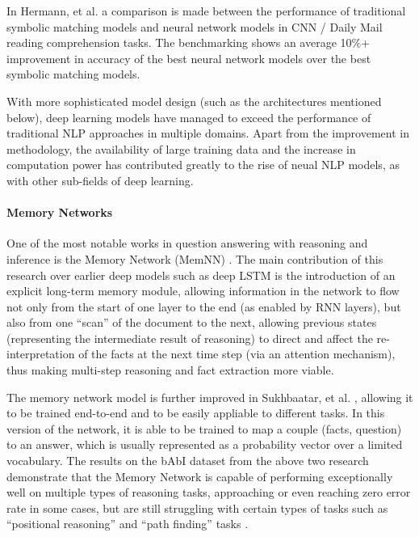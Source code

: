 \documentclass[]{article}
\begin{document}
In Hermann, et al. \cite{hermann2015teaching} a comparison is made between the performance of traditional symbolic matching models and neural network models in CNN / Daily Mail reading comprehension tasks. The benchmarking shows an average 10\%+ improvement in accuracy of the best neural network models over the best symbolic matching models. 

With more sophisticated model design (such as the architectures mentioned below), deep learning models have managed to exceed the performance of traditional NLP approaches in multiple domains. Apart from the improvement in methodology, the availability of large training data and the increase in computation power has contributed greatly to the rise of neual NLP models, as with other sub-fields of deep learning.

\paragraph{Memory Networks}
One of the most notable works in question answering with reasoning and inference is the Memory Network (MemNN) \cite{weston2014memory}. The main contribution of this research over earlier deep models such as deep LSTM is the introduction of an explicit long-term memory module, allowing information in the network to flow not only from the start of one layer to the end (as enabled by RNN layers), but also from one “scan” of the document to the next, allowing previous states (representing the intermediate result of reasoning) to direct and affect the re-interpretation of the facts at the next time step (via an attention mechanism), thus making multi-step reasoning and fact extraction more viable. 

The memory network model is further improved in Sukhbaatar, et al. \cite{sukhbaatar2015end}, allowing it to be trained end-to-end and to be easily appliable to different tasks. In this version of the network, it is able to be trained to map a couple (facts, question) to an answer, which is usually represented as a probability vector over a limited vocabulary. The results on the bAbI dataset from the above two research demonstrate that the Memory Network is capable of performing exceptionally well on multiple types of reasoning tasks, approaching or even reaching zero error rate in some cases, but are still struggling with certain types of tasks such as “positional reasoning” and “path finding” tasks \cite{weston2014memory, sukhbaatar2015end}.
\end{document}
